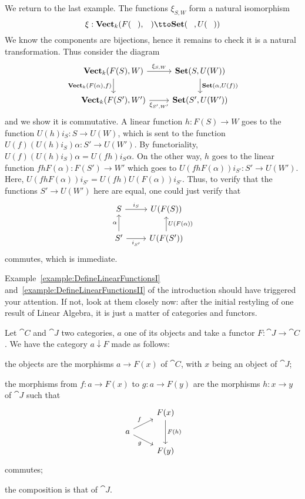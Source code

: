 \begin{example}\label{example:DefineLinearFunctionsII}
  We return to the last example. The functions \(\xi_{S,W}\) form a
  natural isomorphism
  \[\xi : \Vect_k(F(\hole), \hole) \tto \Set(\hole, U(\hole))\]
  We know the components are bijections, hence it remains to check it
  is a natural transformation. Thus consider the diagram
%
  \[\begin{tikzcd}
      \Vect_k(F(S), W) \ar["{\Vect_k(F(\alpha), f)}", d, swap] \ar["{\xi_{S,W}}", r] & \Set(S, U(W)) \ar["{\Set(\alpha, U(f))}", d] \\
      \Vect_k(F(S'), W') \ar["{\xi_{S',W'}}", r, swap] & \Set(S',
      U(W'))
    \end{tikzcd}\]
%
  and we show it is commutative. A linear function \(h : F(S) \to W\)
  goes to the function \(U(h)i_S : S \to U(W)\), which is sent to the
  function \(U(f) (U(h)i_S) \alpha : S' \to U(W')\). By functoriality,
  \(U(f) (U(h)i_S) \alpha = U(fh) i_S \alpha\). On the other way,
  \(h\) goes to the linear function \(f h F(\alpha) : F(S') \to W'\)
  which goes to \(U(f h F(\alpha)) i_{S'} : S' \to U(W')\). Here,
  \(U(f h F(\alpha)) i_{S'} = U(fh) U(F(\alpha))i_{S'}\). Thus, to
  verify that the functions \(S' \to U(W')\) here are equal, one could
  just verify that
  \[\begin{tikzcd}
      S \ar["{i_S}", r] & U(F(S)) \\
      S' \ar["\alpha", u] \ar["{i_{S'}}", r, swap] & U(F(S'))
      \ar["U(F(\alpha))", u, swap]
    \end{tikzcd}\] commutes, which is immediate.
\end{example}

Example~\ref{example:DefineLinearFunctionsI}
and~\ref{example:DefineLinearFunctionsII} of the introduction should
have triggered your attention. If not, look at them closely now: after
the initial restyling of one result of Linear Algebra, it is just a
matter of categories and functors.

\begin{construction}
  Let \(\cat C\) and \(\cat J\) two categories, \(a\) one of its
  objects and take a functor \(F : \cat J \to \cat C\). We have the
  category \(a {\downarrow} F\) made as follows:
  \begin{tcbitem}
  \item the objects are the morphisms \(a \to F(x)\) of \(\cat C\),
    with \(x\) being an object of \(\cat J\);
  \item the morphisms from \(f : a \to F(x)\) to \(g : a \to F(y)\)
    are the morphisms \(h : x \to y\) of \(\cat J\) such that
    \[\begin{tikzcd}[row sep=small]
        & F(x) \ar["{F(h)}", dd] \\
        a \ar["f", ur] \ar["g", dr, swap] \\
        & F(y)
      \end{tikzcd}\] commutes;
  \item the composition is that of \(\cat J\).
  \end{tcbitem}
\end{construction}

